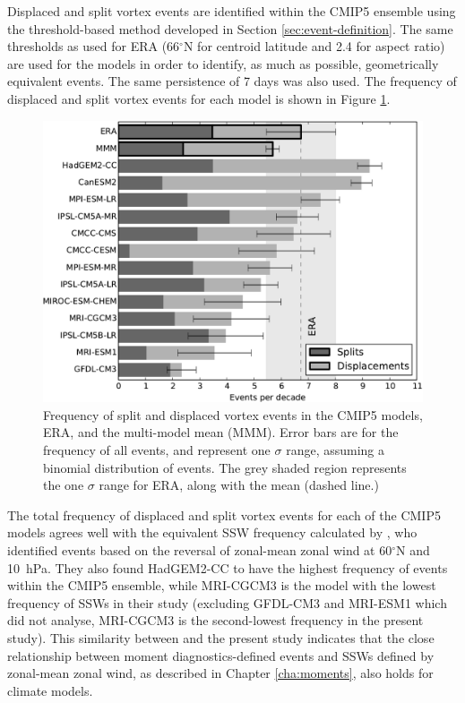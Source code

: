 Displaced and split vortex events are identified within the CMIP5 ensemble using
the threshold-based method developed in Section \ref{sec:event-definition}. The
same thresholds as used for ERA (66$^{\circ}$N for centroid latitude and 2.4 for
aspect ratio) are used for the models in order to identify, as much as possible,
geometrically equivalent events. The same persistence of 7 days was also used.
The frequency of displaced and split vortex events for each model is shown in
Figure \ref{fig:cmip5_events_bar_stacked}.

\begin{figure}
 \centering
 \noindent\includegraphics[width=\textwidth]{figures/chapter-models/events_bar_stacked.pdf}
 \caption[Frequency of split and displaced vortex events in the CMIP5
 models]{Frequency of split and displaced vortex events in the CMIP5 models,
   ERA, and the multi-model mean (MMM). Error bars are for the frequency of all
   events, and represent one $\sigma$ range, assuming a binomial distribution of
   events. The grey shaded region represents the one $\sigma$ range for ERA,
   along with the mean (dashed line.) }
 \label{fig:cmip5_events_bar_stacked}
\end{figure}

The total frequency of displaced and split vortex events for each of the CMIP5
models agrees well with the equivalent SSW frequency calculated by
\citet{Charlton-Perez2013}, who identified events based on the reversal of
zonal-mean zonal wind at 60$^{\circ}$N and 10~hPa. They also found HadGEM2-CC to
have the highest frequency of events within the CMIP5 ensemble, while MRI-CGCM3
is the model with the lowest frequency of SSWs in their study (excluding GFDL-CM3
and MRI-ESM1 which \citet{Charlton-Perez2013} did not analyse, MRI-CGCM3 is the
second-lowest frequency in the present study). This similarity between
\citet{Charlton-Perez2013} and the present study indicates that the close
relationship between moment diagnostics-defined events and SSWs defined by
zonal-mean zonal wind, as described in Chapter \ref{cha:moments}, also holds for
climate models.

